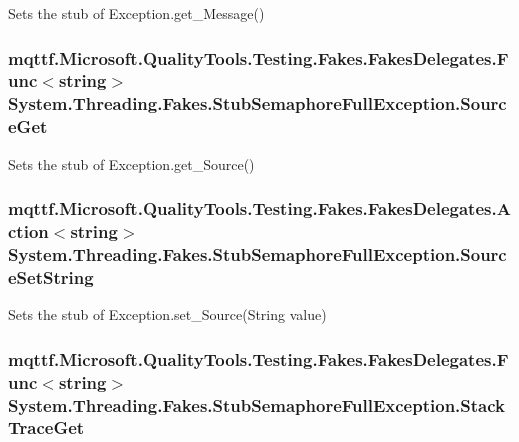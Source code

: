 Sets the stub of Exception.\-get\-\_\-\-Message()

\hypertarget{class_system_1_1_threading_1_1_fakes_1_1_stub_semaphore_full_exception_a398c8ecad130e04bb2f545032daa0ffb}{
\subsubsection[{Source\-Get}]{\setlength{\rightskip}{0pt plus 5cm}mqttf.\-Microsoft.\-Quality\-Tools.\-Testing.\-Fakes.\-Fakes\-Delegates.\-Func$<$string$>$ System.\-Threading.\-Fakes.\-Stub\-Semaphore\-Full\-Exception.\-Source\-Get}}\label{class_system_1_1_threading_1_1_fakes_1_1_stub_semaphore_full_exception_a398c8ecad130e04bb2f545032daa0ffb}


Sets the stub of Exception.\-get\-\_\-\-Source()

\hypertarget{class_system_1_1_threading_1_1_fakes_1_1_stub_semaphore_full_exception_a2572a9b8ca2e9f9355fd293ea46afd1f}{
\subsubsection[{Source\-Set\-String}]{\setlength{\rightskip}{0pt plus 5cm}mqttf.\-Microsoft.\-Quality\-Tools.\-Testing.\-Fakes.\-Fakes\-Delegates.\-Action$<$string$>$ System.\-Threading.\-Fakes.\-Stub\-Semaphore\-Full\-Exception.\-Source\-Set\-String}}\label{class_system_1_1_threading_1_1_fakes_1_1_stub_semaphore_full_exception_a2572a9b8ca2e9f9355fd293ea46afd1f}


Sets the stub of Exception.\-set\-\_\-\-Source(\-String value)

\hypertarget{class_system_1_1_threading_1_1_fakes_1_1_stub_semaphore_full_exception_a68fff73f19f39d9ba49814746366b40b}{
\subsubsection[{Stack\-Trace\-Get}]{\setlength{\rightskip}{0pt plus 5cm}mqttf.\-Microsoft.\-Quality\-Tools.\-Testing.\-Fakes.\-Fakes\-Delegates.\-Func$<$string$>$ System.\-Threading.\-Fakes.\-Stub\-Semaphore\-Full\-Exception.\-Stack\-Trace\-Get}}\label{class_system_1_1_threading_1_1_fakes_1_1_stub_semaphore_full_exception_a68fff73f19f39d9ba49814746366b40b}


